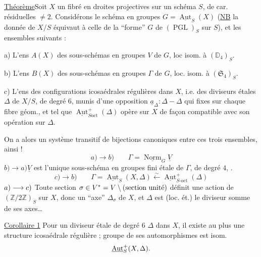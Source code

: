 \uline{Théorème}\quad Soit $X$ un fibré en droites projectives sur un schéma $S$, de car. résiduelles $\ne2$. Considérons le  schéma en groupes $G=\underline{\operatorname{Aut}}_S(X)$ (\uline{NB} la donnée de $X/S$ équivaut à celle de la ``forme'' $G$ de $(\operatorname{PGL})_S$ sur $S$), et les ensembles suivants :

 a) L'ens $A(X)$ des sous-schémas en groupes $V$ de $G$, loc isom. à $(\mathbb D_4)_S$.

 b) L'ens  $B(X)$ des sous-schémas en groupes  $\Gamma$ de $G$, loc. isom. à $(\mathfrak S_4)_S$.

 c) L'ens des configurations icosaédrales régulières dans $X$, i.e. des diviseurs étales $\Delta$ de $X/S$, de degré $6$, munis d'une opposition $\underline a_\Delta:\Delta-\Delta$ qui  fixes sur chaque fibre géom., et tel que $\underline{\operatorname{Aut}}^+_{S\mathrm{oct}}(\Delta)$ opère sur $X$ de façon compatible avec son opération sur $\Delta$.

On a alors un système transitif de bijections canoniques entre ces trois ensembles,  ainsi !
\[
 a)\longrightarrow b)\qquad \Gamma=\underline{\operatorname{Norm}}_G\underline V
\]
$b)\longrightarrow a)$\quad $\underline V$ est l'unique sous-schéma en groupes  fini étale de $\Gamma$,  de degré $4$, .
\[
 c)\longrightarrow b)\qquad
 \Gamma=\underline{\operatorname{Aut}}_S(X,\Delta)\xleftarrow{\sim}\underline{\operatorname{Aut}}^+_{S\text{-}\mathrm{oct}}(\Delta)
\]
$a)\longrightarrow c)$\quad {} Toute section $\sigma\in V^*=V\setminus(\text{section unité})$ définit une action  de  $(\mathbb Z/2\mathbb Z)_S$ sur $X$, donc un ``axe'' $\Delta_\sigma$ de $X$, et $\Delta$ est  (loc. ét.) le  diviseur somme de ses axes\ldots

\uline{Corollaire 1} Pour un diviseur étale de degré $6$ $\Delta$ dans $X$, il existe au plus une structure icosaédrale régulière ;    groupe de ses automorphismes  est isom.
\[
\underline{\operatorname{Aut}}_S^{+}(X,\Delta).
\]

